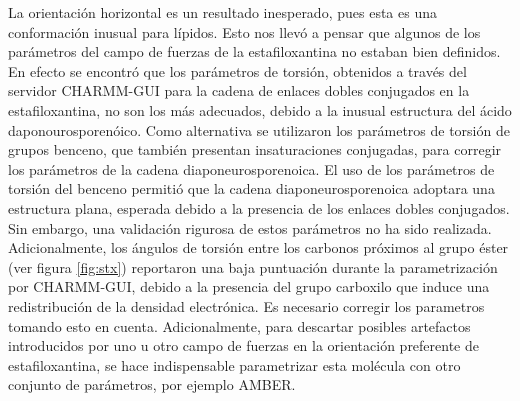 La orientaci\'{o}n horizontal es un resultado inesperado, pues esta es una conformaci\'{o}n inusual para l\'{i}pidos. Esto nos llev\'{o} a pensar que algunos de los par\'{a}metros del campo de fuerzas de la estafiloxantina no estaban bien definidos. En efecto se encontr\'{o} que los par\'{a}metros de torsi\'{o}n, obtenidos a trav\'{e}s del servidor CHARMM-GUI para la cadena de enlaces dobles conjugados en la estafiloxantina, no son los m\'{a}s adecuados, debido a la inusual estructura del \'{a}cido daponourosporen\'{o}ico. Como alternativa se utilizaron los par\'{a}metros de torsi\'{o}n de grupos benceno, que tambi\'{e}n presentan insaturaciones conjugadas, para corregir los par\'{a}metros de la cadena diaponeurosporenoica. El uso de los par\'{a}metros de torsi\'{o}n del benceno permiti\'{o} que la cadena diaponeurosporenoica adoptara una estructura plana, esperada debido a la presencia de los enlaces dobles conjugados. Sin embargo, una validaci\'{o}n rigurosa de estos par\'{a}metros no ha sido realizada. Adicionalmente, los \'{a}ngulos de torsi\'{o}n entre los carbonos pr\'{o}ximos al grupo \'{e}ster (ver figura \ref{fig:stx}) reportaron una baja puntuaci\'{o}n durante la parametrizaci\'{o}n por CHARMM-GUI, debido a la presencia del grupo carboxilo que induce una redistribuci\'{o}n de la densidad electr\'{o}nica. Es necesario corregir los parametros tomando esto en cuenta. Adicionalmente, para descartar posibles artefactos introducidos por uno u otro campo de fuerzas en la orientaci\'{o}n preferente de estafiloxantina, se hace indispensable parametrizar esta mol\'{e}cula con otro conjunto de par\'{a}metros, por ejemplo AMBER.
